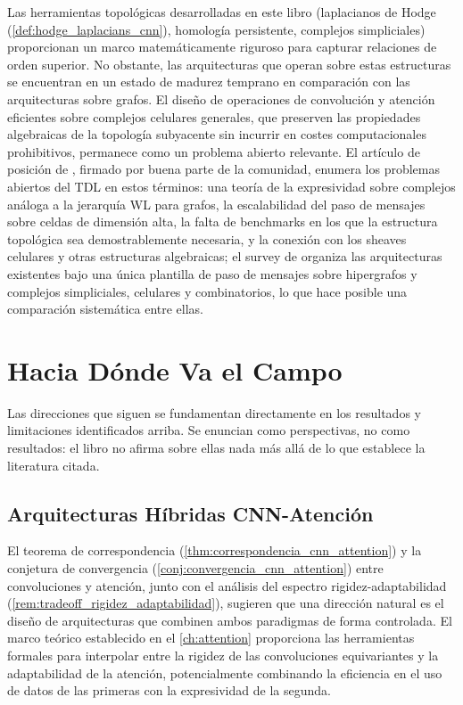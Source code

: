 Las herramientas topológicas desarrolladas en este libro (laplacianos de Hodge (\autoref{def:hodge_laplacians_cnn}), homología persistente, complejos simpliciales) proporcionan un marco matemáticamente riguroso para capturar relaciones de orden superior. No obstante, las arquitecturas que operan sobre estas estructuras se encuentran en un estado de madurez temprano en comparación con las arquitecturas sobre grafos. El diseño de operaciones de convolución y atención eficientes sobre complejos celulares generales, que preserven las propiedades algebraicas de la topología subyacente sin incurrir en costes computacionales prohibitivos, permanece como un problema abierto relevante. El artículo de posición de \citet{papamarkou2024tdlposition}, firmado por buena parte de la comunidad, enumera los problemas abiertos del \gls{TDL} en estos términos: una teoría de la expresividad sobre complejos análoga a la jerarquía WL para grafos, la escalabilidad del paso de mensajes sobre celdas de dimensión alta, la falta de benchmarks en los que la estructura topológica sea demostrablemente necesaria, y la conexión con los sheaves celulares y otras estructuras algebraicas; el survey de \citet{papillon2023tdlarchitectures} organiza las arquitecturas existentes bajo una única plantilla de paso de mensajes sobre hipergrafos y complejos simpliciales, celulares y combinatorios, lo que hace posible una comparación sistemática entre ellas.


\section{Hacia Dónde Va el Campo}

Las direcciones que siguen se fundamentan directamente en los resultados y limitaciones identificados arriba. Se enuncian como perspectivas, no como resultados: el libro no afirma sobre ellas nada más allá de lo que establece la literatura citada.

\subsection{Arquitecturas Híbridas CNN-Atención}

El teorema de correspondencia (\autoref{thm:correspondencia_cnn_attention}) y la conjetura de convergencia (\autoref{conj:convergencia_cnn_attention}) entre convoluciones y atención, junto con el análisis del espectro rigidez-adaptabilidad (\autoref{rem:tradeoff_rigidez_adaptabilidad}), sugieren que una dirección natural es el diseño de arquitecturas que combinen ambos paradigmas de forma controlada. El marco teórico establecido en el \autoref{ch:attention} proporciona las herramientas formales para interpolar entre la rigidez de las convoluciones equivariantes y la adaptabilidad de la atención, potencialmente combinando la eficiencia en el uso de datos de las primeras con la expresividad de la segunda.

